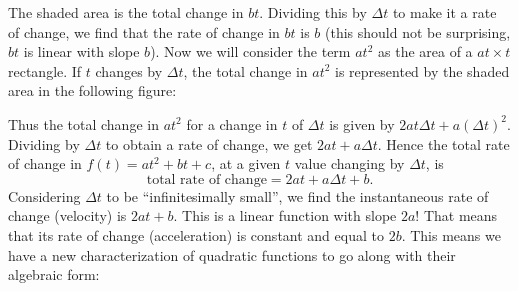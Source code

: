 \vspace{.1in}

\begin{figure}[h]
\centering
{}
\end{figure}

The shaded area is the total change in $bt$. Dividing this by $\Delta t$ to make it a rate of change, we find that the rate of change in $bt$ is $b$ (this should not be surprising, $bt$ is linear with slope $b$). Now we will consider the term $at^2$ as the area of a $at\times t$ rectangle. If $t$ changes by $\Delta t$, the total change in $at^2$ is represented by the shaded area in the following figure:

\begin{figure}[h]
\centering
{}
\end{figure}

Thus the total change in $at^2$ for a change in $t$ of $\Delta t$ is given by $2at\Delta t + a(\Delta t)^2$. Dividing by $\Delta t$ to obtain a rate of change, we get $2at + a\Delta t$. Hence the total rate of change in $f(t) = at^2+bt + c$, at a given $t$ value changing by $\Delta t$, is
\[
\mbox{total rate of change} = 2at + a\Delta t + b.
\]
Considering $\Delta t$ to be  ``infinitesimally small'', we find the instantaneous rate of change (velocity) is $2at + b$. This is a linear function with slope $2a$! That means that its rate of change (acceleration) is constant and equal to $2b$. This means we have a new characterization of quadratic functions to go along with their algebraic form:


